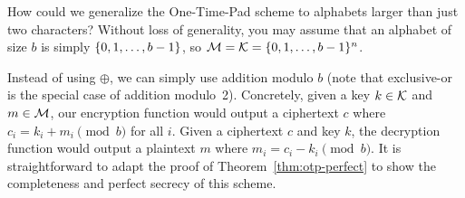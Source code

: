 \documentclass[11pt]{article}
\begin{document}
\begin{question}
  How could we generalize the One-Time-Pad scheme to alphabets larger
  than just two characters? Without loss of generality, you may assume
  that an alphabet of size \(b\) is simply \(\{0,1,\ldots, b-1\}\),
  so \(\mathcal{M} = \mathcal{K} = \{0,1, \ldots, b-1\}^n\).
\end{question}

\begin{answer}
  Instead of using \(\oplus\), we can simply use addition modulo \(b\)
  (note that exclusive-or is the special case of addition
  modulo~2). Concretely, given a key \(k \in \mathcal{K}\) and
  \(m \in \mathcal{M}\), our encryption function would output a
  ciphertext \(c\) where \(c_i = k_i + m_i \pmod{b}\) for all \(i\).
  Given a ciphertext \(c\) and key \(k\), the decryption function
  would output a plaintext \(m\) where \(m_i = c_i - k_i
  \pmod{b}\). It is straightforward to adapt the proof of
  Theorem~\ref{thm:otp-perfect} to show the completeness and perfect
  secrecy of this scheme.
\end{answer}
\end{document}

